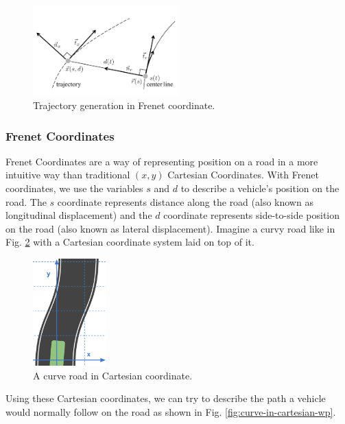 \begin{figure}[h]
\centering
\includegraphics[width=0.5\textwidth]{figs/ch3/traj-generation}
\caption{Trajectory generation in Frenet coordinate.}
\label{fig:traj-generation}
\end{figure}

\subsubsection{Frenet Coordinates}


Frenet Coordinates are a way of representing position on a road in a more intuitive way than traditional $(x,y)$ Cartesian Coordinates. With Frenet coordinates, we use the variables $s$ and $d$ to describe a vehicle's position on the road. The $s$ coordinate represents distance along the road (also known as longitudinal displacement) and the $d$ coordinate represents side-to-side position on the road (also known as lateral displacement). Imagine a curvy road like in Fig. \ref{fig:curve-in-cartesian} with a Cartesian coordinate system laid on top of it.

\begin{figure}[h]
\centering
\includegraphics[width=0.25\textwidth]{figs/ch3/curve-in-cartesian}
\caption{A curve road in Cartesian coordinate.}
\label{fig:curve-in-cartesian}
\end{figure}

Using these Cartesian coordinates, we can try to describe the path a vehicle would normally follow on the road as shown in Fig. \ref{fig:curve-in-cartesian-wp}.

